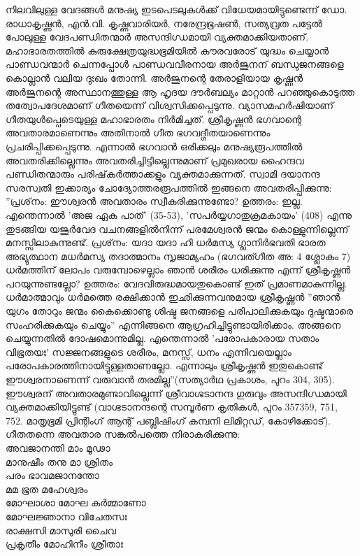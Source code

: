 നിലവിലുള്ള വേദങ്ങള്‍ മനുഷ്യ ഇടപെടലുകള്‍ക്ക് വിധേയമായിട്ടുണ്ടെന്ന് ഡോ. രാധാകൃഷ്ണന്‍, എന്‍.വി. കൃഷ്ണവാരിയര്‍, നരേന്ദ്രഭൂഷണ്‍, സത്യവ്രത പട്ടേല്‍ പോലുള്ള വേദപണ്ഡിതന്മാര്‍ അസന്ദിഗ്ധമായി വ്യക്തമാക്കിയതാണ്.
മഹാഭാരതത്തില്‍ കുരുക്ഷേത്രയുദ്ധഭൂമിയില്‍ കൗരവരോട് യുദ്ധം ചെയ്യാന്‍ പാണ്ഡവന്മാര്‍ ചെന്നപ്പോള്‍ പാണ്ഡവവീരനായ അര്‍ജുനന് ബന്ധുജനങ്ങളെ കൊല്ലാന്‍ വലിയ ദുഃഖം തോന്നി. അര്‍ജുനന്റെ തേരാളിയായ കൃഷ്ണന്‍ അര്‍ജുനന്റെ അസ്ഥാനത്തുള്ള ആ ഹൃദയ ദൗര്‍ബല്യം മാറ്റാന്‍ പറഞ്ഞുകൊടുത്ത തത്വോപദേശമാണ് ഗീതയെന്ന് വിശ്വസിക്കപ്പെടുന്നു. വ്യാസമഹര്‍ഷിയാണ് ഗീതയുള്‍പ്പെടെയുള്ള മഹാഭാരതം നിര്‍മിച്ചത്.
ശ്രീകൃഷ്ണന്‍ ഭഗവാന്റെ അവതാരമാണെന്നും അതിനാല്‍ ഗീത ഭഗവദ്ഗീതയാണെന്നും പ്രചരിപ്പിക്കപ്പെടുന്നു. എന്നാല്‍ ഭഗവാന്‍ ഒരിക്കലും മനുഷ്യരൂപത്തില്‍ അവതരിക്കില്ലെന്നും അവതരിച്ചിട്ടില്ലെന്നുമാണ് പ്രമുഖരായ ഹൈന്ദവ പണ്ഡിതന്മാരും പരിഷ്‌കര്‍ത്താക്കളും വ്യക്തമാക്കുന്നത്. സ്വാമി ദയാനന്ദ സരസ്വതി ഇക്കാര്യം ചോദ്യോത്തരരൂപത്തില്‍ ഇങ്ങനെ അവതരിപ്പിക്കുന്നു:
''പ്രശ്‌നം: ഈശ്വരന്‍ അവതാരം സ്വീകരിക്കുന്നുണ്ടോ?
ഉത്തരം: ഇല്ല. എന്തെന്നാല്‍ 'അജ ഏക പാത്' (35-53), 'സപര്‍യ്യഗാതുക്രമകായം' (408) എന്നു തുടങ്ങിയ യജുര്‍വേദ വചനങ്ങളില്‍നിന്ന് പരമേശ്വരന്‍ ജന്മം കൊള്ളുന്നില്ലെന്ന് മനസ്സിലാകുന്നുണ്ട്.
പ്രശ്‌നം:
യദാ യദാ ഹി ധര്‍മസ്യ
ഗ്ലാനിര്‍ഭവതി ഭാരത
അഭ്യുത്ഥാന മധര്‍മസ്യ
തദാത്മാനം സൃജാമ്യഹം (ഭഗവത്ഗീത അ: 4 ശ്ലോകം 7)
ധര്‍മത്തിന് ലോപം വരുമ്പോഴെല്ലാം ഞാന്‍ ശരീരം ധരിക്കുന്നു എന്ന് ശ്രീകൃഷ്ണന്‍ പറയുന്നുണ്ടല്ലോ?
ഉത്തരം: വേദവിരുദ്ധമായതുകൊണ്ട് ഇത് പ്രമാണമാകുന്നില്ല. ധര്‍മാത്മാവും ധര്‍മത്തെ രക്ഷിക്കാന്‍ ഇഛിക്കുന്നവനുമായ ശ്രീകൃഷ്ണന്‍ ''ഞാന്‍ യുഗം തോറും ജന്മം കൈക്കൊണ്ടു ശിഷ്ട ജനങ്ങളെ പരിപാലിക്കുകയും ദുഷ്ടന്മാരെ സംഹരിക്കുകയും ചെയ്യും'' എന്നിങ്ങനെ ആഗ്രഹിച്ചിട്ടുണ്ടായിരിക്കാം. അങ്ങനെ ചെയ്യുന്നതില്‍ ദോഷമൊന്നുമില്ല. എന്തെന്നാല്‍ 'പരോപകാരായ സതാം വിഭൂതയഃ' സജ്ജനങ്ങളുടെ ശരീരം, മനസ്സ്, ധനം എന്നിവയെല്ലാം പരോപകാരത്തിനായിട്ടുള്ളതാണല്ലോ. എന്നാലും ശ്രീകൃഷ്ണന്‍ ഇതുകൊണ്ട് ഈശ്വരനാണെന്ന് വരുവാന്‍ തരമില്ല''(സത്യാര്‍ഥ പ്രകാശം, പുറം 304, 305).
ഈശ്വരന് അവതാരമുണ്ടാവില്ലെന്ന് ശ്രീവാഗ്ഭടാനന്ദ ഗുരുവും അസന്ദിഗ്ധമായി വ്യക്തമാക്കിയിട്ടുണ്ട് (വാഗ്ഭടാനന്ദന്റെ സമ്പൂര്‍ണ കൃതികള്‍, പുറം 357359, 751, 752. മാതൃഭൂമി പ്രിന്റിംഗ് ആന്റ് പബ്ലിഷിംഗ് കമ്പനി ലിമിറ്റഡ്, കോഴിക്കോട്).
ഗീതതന്നെ അവതാര സങ്കല്‍പത്തെ നിരാകരിക്കുന്നു:\\
അവജാനന്തി മാം മൂഢാ\\
മാനുഷീം തനു മാ ശ്രിതം\\
പരം ഭാവമജാനന്തോ\\
മമ ഭൂത മഹേശ്വരം\\
മോഘാശാ മോഘ കര്‍മ്മാണോ\\
മോഘജ്ഞാനാ വിചേതസഃ\\
രാക്ഷസി മാസുരി ചൈവ\\
പ്രകൃതീം മോഹിനീം ശ്രീതാഃ\\
